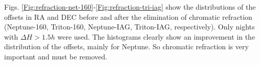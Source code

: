 \documentclass[12pt,a4paper]{report}
\newcommand{\PE}{Perkin-Elmer }
\newcommand{\BC}{Boller \& Chivens }
\begin{document}
Figs. \ref{Fig:refraction-net-160}-\ref{Fig:refraction-tri-iag} show the distributions of the offsets in RA and DEC before and after the elimination of chromatic refraction (Neptune-160, Triton-160, Neptune-IAG, Triton-IAG, respectively). Only nights with $\Delta H > 1.5h$ were used. The histograms clearly show an improvement in the distribution of the offsets, mainly for Neptune. So chromatic refraction is very important and must be removed. %

\end{document}
